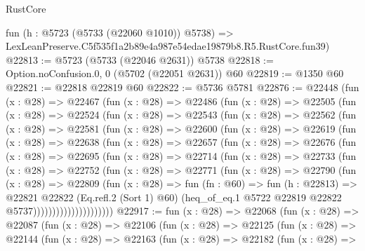 \begin{lexlean}{RustCore}
\begin{coremodule}
    fun (h : @5723 (@5733 (@22060 @1010)) @5738) =>
    LexLeanPreserve.C5f535f1a2b89e4a987e54edae19879b8.R5.RustCore.fun39)
@22813 := @5723 (@5733 (@22046 @2631)) @5738
@22818 := Option.noConfusion.{0, 0} (@5702 (@22051 @2631)) @60
@22819 := @1350 @60
@22821 := @22818 @22819 @60
@22822 := @5736 @5781
@22876 := @22448
    (fun (x : @28) =>
    @22467
      (fun (x : @28) =>
      @22486
        (fun (x : @28) =>
        @22505
          (fun (x : @28) =>
          @22524
            (fun (x : @28) =>
            @22543
              (fun (x : @28) =>
              @22562
                (fun (x : @28) =>
                @22581
                  (fun (x : @28) =>
                  @22600
                    (fun (x : @28) =>
                    @22619
                      (fun (x : @28) =>
                      @22638
                        (fun (x : @28) =>
                        @22657
                          (fun (x : @28) =>
                          @22676
                            (fun (x : @28) =>
                            @22695
                              (fun (x : @28) =>
                              @22714
                                (fun (x : @28) =>
                                @22733
                                  (fun (x : @28) =>
                                  @22752
                                    (fun (x : @28) =>
                                    @22771
                                      (fun (x : @28) =>
                                      @22790
                                        (fun (x : @28) =>
                                        @22809
                                          (fun (x : @28) =>
                                          fun (fn : @60) =>
                                          fun (h : @22813) =>
                                          @22821
                                            @22822
                                            (Eq.refl.{2} (Sort 1) @60)
                                            (heq_of_eq.{1}
                                              @5722
                                              @22819
                                              @22822
                                              @5737)))))))))))))))))))))
@22917 := fun (x : @28) =>
  @22068
    (fun (x : @28) =>
    @22087
      (fun (x : @28) =>
      @22106
        (fun (x : @28) =>
        @22125
          (fun (x : @28) =>
          @22144
            (fun (x : @28) =>
            @22163
              (fun (x : @28) =>
              @22182
                (fun (x : @28) =>

\end{coremodule}
\end{lexlean}
